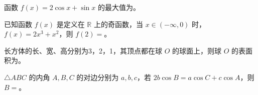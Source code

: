 \begin{question}
函数 \(f(x)=2\cos x+\sin x\) 的最大值为\gkblank{}。

\end{question}
\begin{question}
已知函数 \(f(x)\) 是定义在 \(\mathbb R\) 上的奇函数，当 \(x\in(-\infty,0)\) 时，\(f(x)=2x^3+x^2\)，则 \(f(2)=\)\gkblank{}。

\end{question}
\begin{question}
长方体的长、宽、高分别为3，2，1，其顶点都在球 \(O\) 的球面上，则球 \(O\) 的表面积为\gkblank{}。

\end{question}
\begin{question}
\(\triangle ABC\) 的内角 \(A,B,C\) 的对边分别为 \(a,b,c\)，若 \(2b\cos B=a\cos C+c\cos A\)，则 \(B=\)\gkblank{}。

\end{question}

